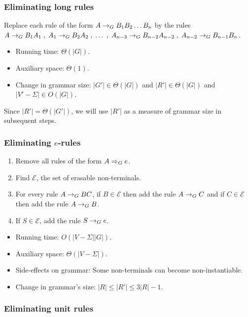 \subsubsection{Eliminating long rules}

Replace each rule of the form $A \rightarrow_{G} B_1B_2\ldots B_n$ by the rules
$A \rightarrow_{G} B_1A_1 \;,\; A_1 \rightarrow_{G} B_2A_2 \;,\; \ldots \;,\;
A_{n-3} \rightarrow_{G} B_{n-2}A_{n-2} \;,\; A_{n-2} \rightarrow_{G} B_{n-1}B_n$.

\begin{itemize}
\item Running time: $\Theta(|G|)$.
\item Auxiliary space: $\Theta(1)$.
\item Change in grammar size: $|G'| \in \Theta(|G|)$ and $|R'| \in \Theta(|G|)$ and $|V'-\Sigma| \in O(|G|)$.
\end{itemize}

Since $|R'| = \Theta(|G'|)$, we will use $|R'|$ as a measure of grammar size in subsequent steps.

\subsubsection[Eliminating e-rules]{Eliminating $e$-rules}

\begin{enumerate}
\item Remove all rules of the form $A \Rightarrow_{G} e$.
\item Find $\mathcal{E}$, the set of erasable non-terminals.
\item For every rule $A \rightarrow_{G} BC$,
    if $B \in \mathcal{E}$ then add the rule $A \rightarrow_{G} C$
    and if $C \in \mathcal{E}$ then add the rule $A \rightarrow_{G} B$.
\item If $S \in \mathcal{E}$, add the rule $S \rightarrow_{G} e$.
\end{enumerate}

\begin{itemize}
\item Running time: $O(|V-\Sigma||G|)$.
\item Auxiliary space: $\Theta(|V-\Sigma|)$.
\item Side-effects on grammar: Some non-terminals can become non-instantiable.
\item Change in grammar's size: $|R| \le |R'| \le 3|R|-1$.
\end{itemize}

\subsubsection{Eliminating unit rules}

